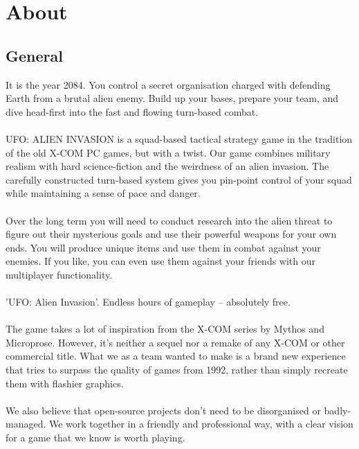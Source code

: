 

\section{About}
\subsection{General}
It is the year 2084. You control a secret organisation charged with defending Earth from a brutal alien enemy. Build up your bases, prepare your team, and dive head-first into the fast and flowing turn-based combat.\\
\\
UFO: ALIEN INVASION is a squad-based tactical strategy game in the tradition of the old X-COM PC games, but with a twist. Our game combines military realism with hard science-fiction and the weirdness of an alien invasion. The carefully constructed turn-based system gives you pin-point control of your squad while maintaining a sense of pace and danger.\\
\\
Over the long term you will need to conduct research into the alien threat to figure out their mysterious goals and use their powerful weapons for your own ends. You will produce unique items and use them in combat against your enemies. If you like, you can even use them against your friends with our multiplayer functionality.\\
\\
'UFO: Alien Invasion'. Endless hours of gameplay -- absolutely free.\\
\\
The game takes a lot of inspiration from the X-COM series by Mythos and Microprose. However, it's neither a sequel nor a remake of any X-COM or other commercial title. What we as a team wanted to make is a brand new experience that tries to surpass the quality of games from 1992, rather than simply recreate them with flashier graphics.\\
\\
We also believe that open-source projects don't need to be disorganised or badly-managed. We work together in a friendly and professional way, with a clear vision for a game that we know is worth playing.

